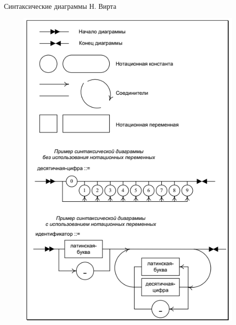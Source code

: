 \documentclass{beamer}
\begin{document}
\begin{frame}
\begin{block}{Синтаксические диаграммы Н. Вирта}
\begin{figure}[h]
\centering
\includegraphics[scale=0.35]{images/lec01-pic15.png}
\end{figure}
\end{block}
\end{frame}
\end{document}
